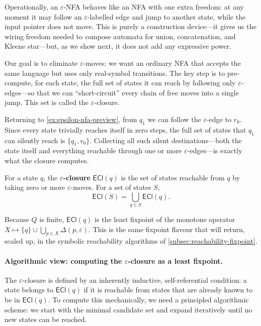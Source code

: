 Operationally, an $\varepsilon$-NFA behaves like an NFA with one extra
freedom: at any moment it may follow an $\varepsilon$-labelled edge and
jump to another state, while the input pointer does not move.  This is
purely a construction device---it gives us the wiring freedom needed to
compose automata for union, concatenation, and Kleene star---but, as we
show next, it does not add any expressive power.

Our goal is to eliminate $\varepsilon$-moves: we want an ordinary NFA
that accepts the same language but uses only real-symbol transitions.
The key step is to pre-compute, for each state, the full set of states
it can reach by following only $\varepsilon$-edges---so that we can
``short-circuit'' every chain of free moves into a single jump.  This
set is called the $\varepsilon$-closure.

Returning to \cref{ex:epsilon-nfa-preview}, from $q_1$ we can follow
the $\varepsilon$-edge to $r_0$.  Since every state trivially reaches
itself in zero steps, the full set of states that $q_1$ can silently
reach is $\{q_1, r_0\}$.  Collecting all such silent destinations---both
the state itself and everything reachable through one or more
$\varepsilon$-edges---is exactly what the closure computes.

\begin{definition}
\label{def:epsilon-closure}
For a state $q$, the \textbf{$\varepsilon$-closure}
$\mathsf{ECl}(q)$ is the set of states reachable from $q$ by taking
zero or more $\varepsilon$-moves.  For a set of states $S$,
\[
  \mathsf{ECl}(S)=\bigcup_{q\in S}\mathsf{ECl}(q).
\]
\end{definition}

Because $Q$ is finite, $\mathsf{ECl}(q)$ is the least fixpoint of the
monotone operator $X\mapsto\{q\}\cup\bigcup_{p\in X}\Delta(p,\varepsilon)$.
This is the same fixpoint flavour that will return, scaled up, in the
symbolic reachability algorithms of \cref{subsec:reachability-fixpoint}.

\paragraph{Algorithmic view: computing the $\varepsilon$-closure as a least fixpoint.}
The $\varepsilon$-closure is defined by an inherently inductive, self-referential condition: a state belongs to $\mathsf{ECl}(q)$ if it is reachable from states that are already known to be in $\mathsf{ECl}(q)$. To compute this mechanically, we need a principled algorithmic scheme: we start with the minimal candidate set and expand iteratively until no new states can be reached.

